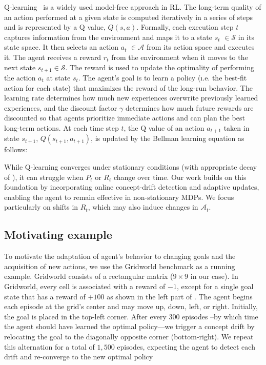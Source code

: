 Q-learning~\cite{watkins92} is a widely used model-free approach in \ac{RL}. The long-term quality of an action performed at a given state is computed iteratively in a series of steps and is represented by a Q value,
$\mathit{Q(s,a)}$.
Formally, each execution step $t$ captures information from the environment and maps it to a state
{\color{purple}$s_t$} $\in \mathcal{S}$ in its state space. It then selects an
action {\color{purple}$a_t$} $\in \mathcal{A}$ from its action space and executes it. The agent
receives a reward {\color{Bittersweet}$r_t$} from the environment when it moves to the next state
$s_{t+1} \in \mathcal{S}$. The reward is used to update the optimality of performing the
action {\color{Mulberry}$a_t$} at state {\color{purple}$s_t$}. The agent's goal is to learn
a policy (\i.e. the best-fit action for each state) that maximizes the reward of the
long-run behavior. The learning rate \lrate{\alpha} determines how much new experiences 
overwrite previously learned experiences, and the discount factor {\color{RoyalBlue} $\gamma$} 
determines how much future rewards are discounted so that agents prioritize immediate actions and 
can plan the best long-term actions. At each time step $t$, the Q value of an action 
{\color{purple}$a_{t+1}$} taken in state {\color{purple}$s_{t+1}$}, $Q(s_{t+1}, a_{t+1})$, is updated by 
the Bellman learning equation as follows:

\vspace{1em}


While Q-learning converges under stationary conditions (with appropriate decay of \lrate{\alpha}), it can struggle when $P_t$ or $R_t$ change over time. Our work builds on this foundation by incorporating online concept-drift detection and adaptive updates, enabling the agent to remain effective in non-stationary MDPs. We focus particularly on shifts in $R_t$, which may also induce changes in $\mathcal{A}_t$.


\subsection{Motivating example}
\label{sec:motivation}


To motivate the adaptation of agent's behavior to changing goals and the acquisition of new actions, 
we use the Gridworld benchmark as a running example.
Gridworld consists of a rectangular matrix ($9\times 9$ in our case). In Gridworld, every cell is 
associated with a reward of $-1$, except for a single goal state that has a reward of $+100$ as shown 
in the left part of . The agent begins each episode at the grid's center and may move 
up, down, left, or right. Initially, the goal is placed in the top-left corner. After every 300 episodes --by 
which time the agent should have learned the optimal policy---we trigger a concept drift by relocating 
the goal to the diagonally opposite corner (bottom-right). We repeat this alternation for a total of $1,500$ 
episodes, expecting the agent to detect each drift and re-converge to the new optimal policy

